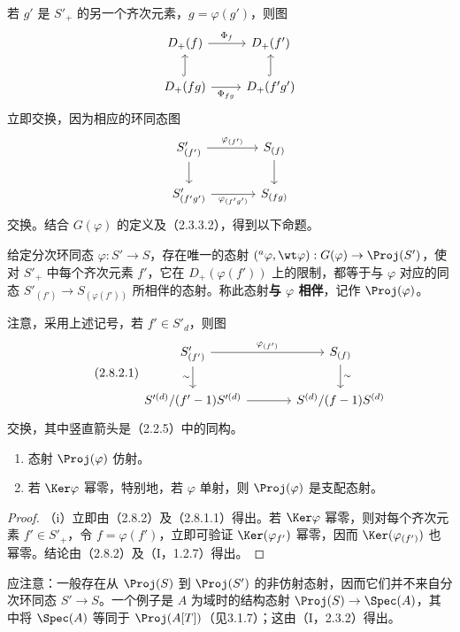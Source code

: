 若 $g'$ 是 $S'_+$ 的另一个齐次元素，$g=\varphi(g')$，则图
\[
\begin{tikzcd}
D_+(f) \arrow[r,"\Phi_f"] & D_+(f')\\
D_+(fg) \arrow[r,"\Phi_{fg}"'] \arrow[u,hook] & D_+(f'g') \arrow[u,hook]
\end{tikzcd}
\]
立即交换，因为相应的环同态图
\[
\begin{tikzcd}[column sep=large]
S'_{(f')} \arrow[r,"\varphi_{(f')}"] \arrow[d] & S_{(f)} \arrow[d]\\
S'_{(f'g')} \arrow[r,"\varphi_{(f'g')}"'] & S_{(fg)}
\end{tikzcd}
\]
交换。结合 $G(\varphi)$ 的定义及（2.3.3.2），得到以下命题。

给定分次环同态 $\varphi:S'\to S$，存在唯一的态射
$({}^{a}\varphi,\wt\varphi):G(\varphi)\to\Proj(S')$，使对 $S'_+$ 中每个齐次元素 $f'$，它在 $D_+(\varphi(f'))$ 上的限制，都等于与 $\varphi$ 对应的同态
$S'_{(f')}\to S_{(\varphi(f'))}$ 所相伴的态射。称此态射\textbf{与 $\varphi$ 相伴}，记作 $\Proj(\varphi)$。

注意，采用上述记号，若 $f'\in S'_d$，则图
\begin{equation}\tag{2.8.2.1}
\begin{tikzcd}[column sep=large]
S'_{(f')} \arrow[r,"\varphi_{(f')}"] \arrow[d,"\sim"'] & S_{(f)} \arrow[d,"\sim"]\\
S'^{(d)}/(f'-1)S'^{(d)} \arrow[r] & S^{(d)}/(f-1)S^{(d)}
\end{tikzcd}
\end{equation}
交换，其中竖直箭头是（2.2.5）中的同构。

\begin{enumerate}[label=(\roman*)]
\item 态射 $\Proj(\varphi)$ 仿射。
\item 若 $\Ker\varphi$ 幂零，特别地，若 $\varphi$ 单射，则 $\Proj(\varphi)$ 是支配态射。
\end{enumerate}
\begin{proof}
（i）立即由（2.8.2）及（2.8.1.1）得出。若 $\Ker\varphi$ 幂零，则对每个齐次元素 $f'\in S'_+$，令 $f=\varphi(f')$，立即可验证
$\Ker(\varphi_{f'})$ 幂零，因而 $\Ker(\varphi_{(f')})$ 也幂零。结论由（2.8.2）及（I，1.2.7）得出。
\end{proof}

应注意：一般存在从 $\Proj(S)$ 到 $\Proj(S')$ 的非仿射态射，因而它们并不来自分次环同态 $S'\to S$。一个例子是 $A$ 为域时的结构态射
$\Proj(S)\to\Spec(A)$，其中将 $\Spec(A)$ 等同于 $\Proj(A[T])$（见3.1.7）；这由（I，2.3.2）得出。


